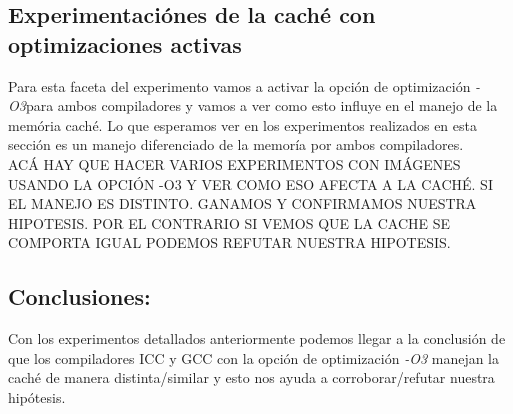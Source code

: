 \subsection{Experimentaciónes de la caché con optimizaciones activas}

Para esta faceta del experimento vamos a activar la opción de optimización \textit{-O3}para ambos compiladores y vamos a ver como esto influye en el manejo de la memória caché. Lo que esperamos ver en los experimentos realizados en esta sección es un manejo diferenciado de la memoría por ambos compiladores.\\

ACÁ HAY QUE HACER VARIOS EXPERIMENTOS CON IMÁGENES USANDO LA OPCIÓN -O3 Y VER COMO ESO AFECTA A LA CACHÉ. SI EL MANEJO ES DISTINTO. GANAMOS Y CONFIRMAMOS NUESTRA HIPOTESIS. POR EL CONTRARIO SI VEMOS QUE LA CACHE SE COMPORTA IGUAL PODEMOS REFUTAR NUESTRA HIPOTESIS.

\subsection{Conclusiones:}
Con los experimentos detallados anteriormente podemos llegar a la conclusión de que los compiladores ICC y GCC con la opción de optimización \textit{-O3} manejan la caché de manera distinta/similar y esto nos ayuda a corroborar/refutar nuestra hipótesis.
